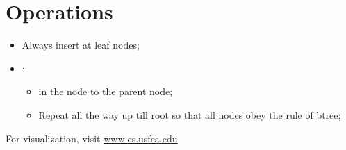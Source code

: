 \section{Operations}

\begin{itemize}
  \item Always insert at leaf nodes;
  \item {}:
  \begin{itemize}
    \item {} in the node to the parent node;
    \item Repeat all the way up till root so that all nodes obey the rule 
    of btree;
  \end{itemize}
\end{itemize}

For visualization, visit
\href{https://www.cs.usfca.edu/~galles/visualization/BTree.html}{www.cs.usfca.edu}